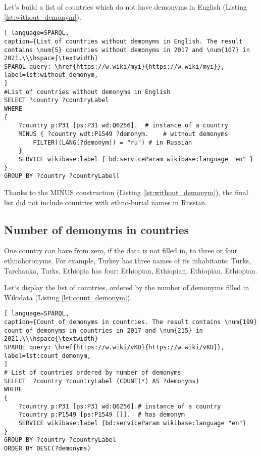 Let's build a list of countries which do not have demonyms in English (Listing \ref{lst:without_demonym}).
\begin{lstlisting}[ language=SPARQL, 
caption={List of countries without demonyms in English. The result contains \num{5} countries without demonyms in 2017 and \num{107} in 2021.\\\hspace{\textwidth}
SPARQL query: \href{https://w.wiki/myi}{https://w.wiki/myi}},
label=lst:without_demonym, 
]
#List of countries without demonyms in English
SELECT ?country ?countryLabel 
WHERE
{
	?country p:P31 [ps:P31 wd:Q6256].  # instance of a country
	MINUS { ?country wdt:P1549 ?demonym.    # without demonyms
		FILTER((LANG(?demonym)) = "ru") # in Russian
	}
	SERVICE wikibase:label { bd:serviceParam wikibase:language "en" }
}
GROUP BY ?country ?countryLabell
\end{lstlisting}

Thanks to the MINUS construction (Listing \ref{lst:without_demonym}), the final list did not include countries with ethno-burial names in Russian.

\subsection{Number of demonyms in countries}

One country can have from zero, if the data is not filled in, to three or four ethnohoronyms. For example, Turkey has three names of its inhabitants: Turks, Tarchanka, Turks, Ethiopia has four: Ethiopian, Ethiopian, Ethiopian, Ethiopian.

Let`s display the list of countries, ordered by the number of demonyms filled in Wikidata (Listing \ref{lst:count_demonym}).

\begin{lstlisting}[ language=SPARQL, 
caption={Count of demonyms in countries. The result contains \num{199} count of demonyms in countries in 2017 and \num{215} in 2021.\\\hspace{\textwidth}
SPARQL query: \href{https://w.wiki/vKD}{https://w.wiki/vKD}},
label=lst:count_demonym, 
]
# List of countries ordered by number of demonyms
SELECT  ?country ?countryLabel (COUNT(*) AS ?demonyms)
WHERE
{
	?country p:P31 [ps:P31 wd:Q6256].# instance of a country
	?country p:P1549 [ps:P1549 []].  # has demonym
	SERVICE wikibase:label {bd:serviceParam wikibase:language "en"}
}
GROUP BY ?country ?countryLabel 
ORDER BY DESC(?demonyms)
\end{lstlisting}

